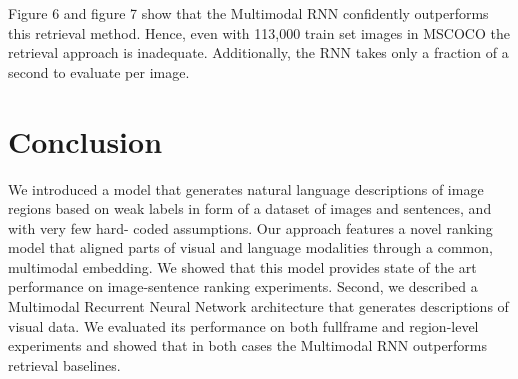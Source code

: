 \documentclass[12pt]{article}%
\begin{document}
Figure 6 and figure 7 show that the Multimodal RNN confidently outperforms this retrieval method. Hence, even with 113,000 train set images in MSCOCO the retrieval approach is inadequate. Additionally, the RNN takes only a fraction of a second to evaluate per image.





\section{Conclusion}

We introduced a model that generates natural language descriptions of image regions based on weak labels in form of a dataset of images and sentences, and with very few hard- coded assumptions. Our approach features a novel ranking model that aligned parts of visual and language modalities through a common, multimodal embedding. We showed that this model provides state of the art performance on image-sentence ranking experiments. Second, we described a Multimodal Recurrent Neural Network architecture that generates descriptions of visual data. We evaluated its performance on both fullframe and region-level experiments and showed that in both cases the Multimodal RNN outperforms retrieval baselines.
\end{document}
